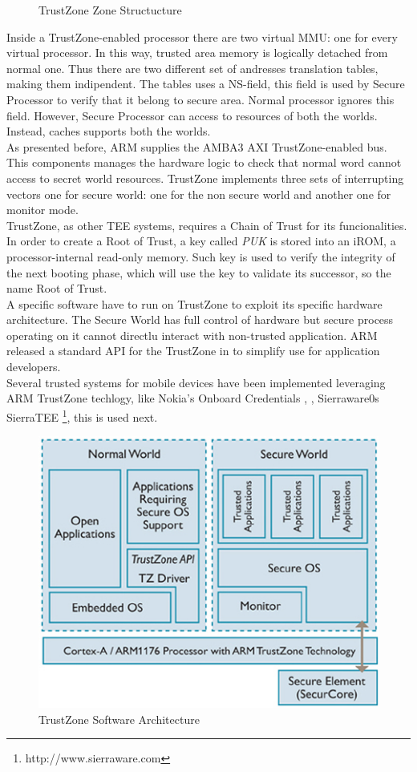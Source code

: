 \documentclass[../tesi.tex]{subfiles}
\begin{document}
{\begin{figure}
\caption{TrustZone Zone Structucture}
\label{fig:trustzonearchitecture}
\end{figure}
Inside a TrustZone-enabled processor there are two virtual MMU: one for every virtual processor. In this way, trusted area memory is logically detached from normal one. Thus there are two different set of andresses translation tables, making them indipendent. The tables uses a NS-field, this field is used by Secure Processor to verify that it belong to secure area. Normal processor ignores this field. However, Secure Processor can access to resources of both the worlds. Instead, caches supports both the worlds. \\
As presented before, ARM supplies the AMBA3 AXI TrustZone-enabled bus. This components manages the hardware logic to check that normal word cannot access to secret world resources. 
TrustZone implements three sets of interrupting vectors one for secure world: one for the non secure world and another one for monitor mode. \\
TrustZone, as other TEE systems, requires a Chain of Trust for its funcionalities. In order to create a Root of Trust, a key called \emph{PUK} is stored into an iROM, a processor-internal read-only memory. Such key is used to verify the integrity of the next booting phase, which will use the key to validate its successor, so the name Root of Trust. \\
A specific software have to run on TrustZone to exploit its specific hardware architecture. The Secure World has full control of hardware but secure process operating on it cannot directlu interact with non-trusted application. ARM released a standard API for the TrustZone in to simplify use for application developers. \\ 
Several trusted systems for mobile devices have been implemented leveraging ARM TrustZone techlogy, like Nokia's Onboard Credentials \cite{ekberg2008onboard}, \cite{kostiainen2009board} , Sierraware0s SierraTEE \footnote{http://www.sierraware.com}, this is used next. 
\begin{figure}
\centering
\includegraphics[scale=0.60]{images/trustzonesoftware.jpg}
\caption{TrustZone Software Architecture}
\label{fig:trustzonesoftware}
\end{figure}
}
\end{document}

